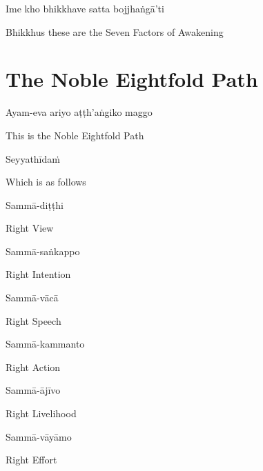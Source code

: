 Ime kho bhikkhave satta bojjhaṅgā’ti

\begin{english}
  Bhikkhus these are the Seven Factors of Awakening
\end{english}

\suttaRef{[SN 46.22]}


\section{The Noble Eightfold Path}
\label{noble-eightfold-path}

\begin{leader}
\end{leader}

Ayam-eva ariyo aṭṭh'aṅgiko maggo

\begin{english}
  This is the Noble Eightfold Path
\end{english}

Seyyathīdaṁ

\begin{english}
  Which is as follows
\end{english}

Sammā-diṭṭhi

\begin{english}
  Right View
\end{english}

Sammā-saṅkappo

\begin{english}
  Right Intention
\end{english}

Sammā-vācā

\begin{english}
  Right Speech
\end{english}

Sammā-kammanto

\begin{english}
  Right Action
\end{english}

Sammā-ājīvo

\begin{english}
  Right Livelihood
\end{english}

Sammā-vāyāmo

\begin{english}
  Right Effort
\end{english}

